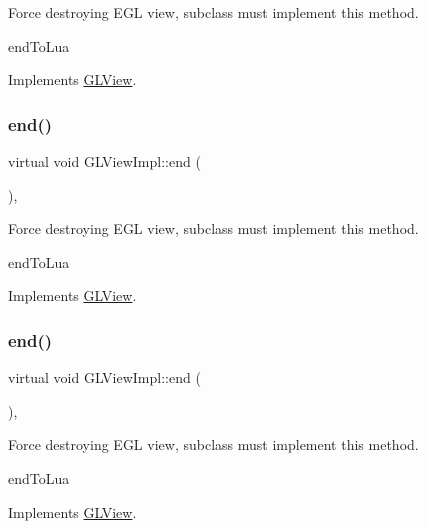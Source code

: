 Force destroying E\+GL view, subclass must implement this method.

end\+To\+Lua 

Implements \hyperlink{classGLView_aaa284e08de7b4e530a2b15b1d27dced0}{G\+L\+View}.

\mbox{\label{classGLViewImpl_ab5a08a3ea92598cdabbed94686eed58a}} 
\subsubsection{\texorpdfstring{end()}{end()}\hspace{0.1cm}{\footnotesize\ttfamily [7/9]}}
{\footnotesize\ttfamily virtual void G\+L\+View\+Impl\+::end (\begin{DoxyParamCaption}{ }\end{DoxyParamCaption})\hspace{0.3cm}{\ttfamily [override]}, {\ttfamily [virtual]}}

Force destroying E\+GL view, subclass must implement this method.

end\+To\+Lua 

Implements \hyperlink{classGLView_aaa284e08de7b4e530a2b15b1d27dced0}{G\+L\+View}.

\mbox{\label{classGLViewImpl_ab5a08a3ea92598cdabbed94686eed58a}} 
\subsubsection{\texorpdfstring{end()}{end()}\hspace{0.1cm}{\footnotesize\ttfamily [8/9]}}
{\footnotesize\ttfamily virtual void G\+L\+View\+Impl\+::end (\begin{DoxyParamCaption}{ }\end{DoxyParamCaption})\hspace{0.3cm}{\ttfamily [override]}, {\ttfamily [virtual]}}

Force destroying E\+GL view, subclass must implement this method.

end\+To\+Lua 

Implements \hyperlink{classGLView_aaa284e08de7b4e530a2b15b1d27dced0}{G\+L\+View}.

\mbox{\label{classGLViewImpl_a045b39ae9907d0c2d25d49a70e5ce9e4}} 
